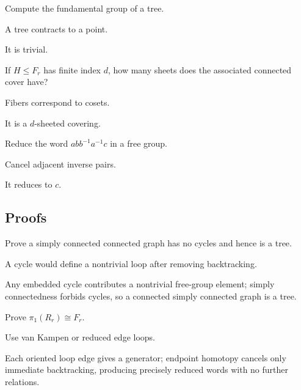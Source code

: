 \begin{exercise}\label{exr:viii14-ped-03}
Compute the fundamental group of a tree.
\end{exercise}
\begin{hint}
A tree contracts to a point.
\end{hint}
\begin{solution}
It is trivial.
\end{solution}

\begin{exercise}\label{exr:viii14-ped-04}
If $H\le F_r$ has finite index $d$, how many sheets does the associated connected cover have?
\end{exercise}
\begin{hint}
Fibers correspond to cosets.
\end{hint}
\begin{solution}
It is a $d$-sheeted covering.
\end{solution}

\begin{exercise}\label{exr:viii14-ped-05}
Reduce the word $ab b^{-1}a^{-1}c$ in a free group.
\end{exercise}
\begin{hint}
Cancel adjacent inverse pairs.
\end{hint}
\begin{solution}
It reduces to $c$.
\end{solution}

\subsection*{Proofs}

\begin{exercise}\label{exr:viii14-ped-06}
Prove a simply connected connected graph has no cycles and hence is a tree.
\end{exercise}
\begin{hint}
A cycle would define a nontrivial loop after removing backtracking.
\end{hint}
\begin{solution}
Any embedded cycle contributes a nontrivial free-group element; simply connectedness forbids cycles, so a connected simply connected graph is a tree.
\end{solution}

\begin{exercise}\label{exr:viii14-ped-07}
Prove $\pi_1(R_r)\cong F_r$.
\end{exercise}
\begin{hint}
Use van Kampen or reduced edge loops.
\end{hint}
\begin{solution}
Each oriented loop edge gives a generator; endpoint homotopy cancels only immediate backtracking, producing precisely reduced words with no further relations.
\end{solution}

